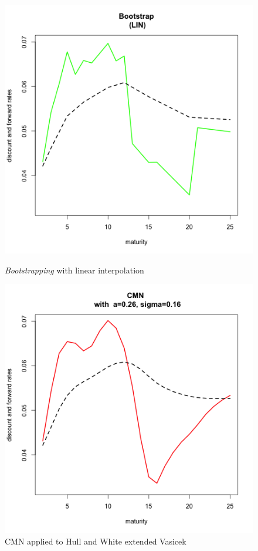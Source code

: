 \medskip
\begin{figure}[!htb]
    \centering
    \begin{minipage}{.5\textwidth}
        \centering
        \includegraphics[width=1.06\linewidth, height=0.37\textheight]{gfx/chapter-yc-insurance/construction_graph1}
        \caption{\textit{Bootstrapping} with linear interpolation}
        \label{fig:andersen2010examples1}
    \end{minipage}%
    \begin{minipage}{0.5\textwidth}
        \centering
        \includegraphics[width=1.06\linewidth, height=0.37\textheight]{gfx/chapter-yc-insurance/construction_graph2}
        \caption{CMN applied to Hull and White extended Vasicek}
        \label{fig:andersen2010examples2}
    \end{minipage}
  \end{figure}

